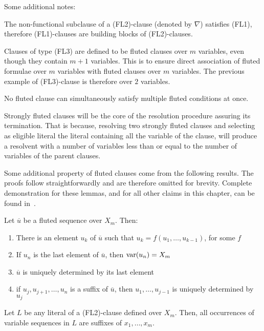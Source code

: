 Some additional notes:
\begin{enumerate*}[label= (\alph*)]
  \item The non-functional subclause of a (FL2)-clause (denoted by \(\nabla\)) satisfies (FL1), therefore (FL1)-clauses are building blocks of (FL2)-clauses.
  \item Clauses of type (FL3) are defined to be fluted clauses over \(m\) variables, even though they contain \(m+1\) variables. This is to ensure direct association of fluted formulae over \(m\) variables with fluted clauses over \(m\) variables. The previous example of (FL3)-clause is therefore over \(2\) variables.
  \item No fluted clause can simultaneously satisfy multiple fluted conditions at once.
\end{enumerate*}

Strongly fluted clauses will be the core of the resolution procedure assuring its termination.
That is because, resolving two strongly fluted clauses and selecting as eligible literal the literal containing all the variable of the clause, will produce a resolvent with a number of variables less than or equal to the number of variables of the parent clauses.

Some additional property of fluted clauses come from the following results.
The proofs follow straightforwardly and are therefore omitted for brevity. Complete demonstration for these lemmas, and for all other claims in this chapter, can be found in~\cite{hustadt2000resolution}.

\begin{lemma}\label{lem:fluted-sequence-properties}
  Let \(\overline{u}\) be a fluted sequence over \(X_m\). Then:
  \begin{enumerate}
    \item There is an element \(u_k\) of \(\overline{u}\) such that \(u_k = f(u_1,\ldots,u_{k-1})\), for some \(f\)
    \item If \(u_n\) is the last element of \(\overline{u}\), then \(\text{var} (u_n) = X_m\)
    \item \(\overline{u}\) is uniquely determined by its last element
    \item if \(u_j, u_{j+1}, \ldots, u_n\) is a suffix of \(\overline{u}\), then \(u_1, \ldots, u_{j-1}\) is uniquely determined by \(u_j\)
  \end{enumerate}
\end{lemma}

\begin{lemma}\label{lem:var-sequence-fl2}
  Let \(L\) be any literal of a (FL2)-clause defined over \(X_m\). Then, all occurrences of variable sequences in \(L\) are suffixes of \(x_1, \ldots, x_m\).
\end{lemma}

